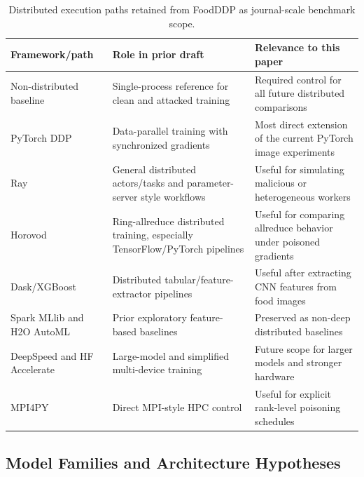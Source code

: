 \documentclass[conference]{IEEEtran}
\begin{document}
\begin{table}[t]
\centering
\caption{Distributed execution paths retained from FoodDDP as journal-scale benchmark scope.}
\label{tab:distributedscope}
\small
\begin{tabular}{p{}p{}p{}}
\toprule
Framework/path & Role in prior draft & Relevance to this paper \\
\midrule
Non-distributed baseline & Single-process reference for clean and attacked training & Required control for all future distributed comparisons \\
PyTorch DDP & Data-parallel training with synchronized gradients & Most direct extension of the current PyTorch image experiments \\
Ray~\cite{moritz2018ray} & General distributed actors/tasks and parameter-server style workflows & Useful for simulating malicious or heterogeneous workers \\
Horovod~\cite{sergeev2018horovod} & Ring-allreduce distributed training, especially TensorFlow/PyTorch pipelines & Useful for comparing allreduce behavior under poisoned gradients \\
Dask/XGBoost & Distributed tabular/feature-extractor pipelines & Useful after extracting CNN features from food images \\
Spark MLlib and H2O AutoML & Prior exploratory feature-based baselines & Preserved as non-deep distributed baselines \\
DeepSpeed and HF Accelerate & Large-model and simplified multi-device training & Future scope for larger models and stronger hardware \\
MPI4PY & Direct MPI-style HPC control & Useful for explicit rank-level poisoning schedules \\
\bottomrule
\end{tabular}
\end{table}

\subsection{Model Families and Architecture Hypotheses}
\end{document}
